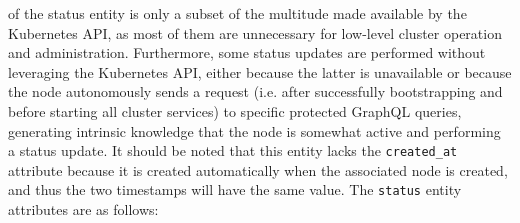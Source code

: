 of the status entity is only a subset of the multitude made available by the Kubernetes
API, as most of them are unnecessary for low-level cluster operation and
administration. Furthermore, some status updates are performed without
leveraging the Kubernetes API, either because the latter is unavailable or because
the node autonomously sends a request (i.e. after successfully bootstrapping and
before starting all cluster services) to specific protected GraphQL queries, generating
intrinsic knowledge that the node is somewhat active and performing a status update.
\newline
It should be noted that this entity lacks the \texttt{created\_at} attribute because
it is created automatically when the associated node is created, and thus the
two timestamps will have the same value.
\newline
The \texttt{status} entity attributes are as follows:

